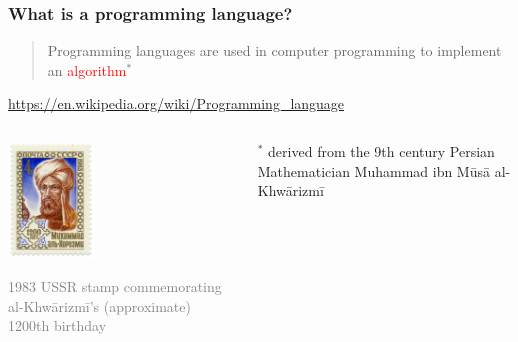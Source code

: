 \documentclass{beamer}
\newcommand{\light}[1]{\textcolor{gray}{#1}}
\newcommand{\red}[1]{\textcolor{red}{#1}}
\begin{document}
\begin{frame}
\frametitle{What is a programming language?}

\begin{quote}
Programming languages are used in computer programming to implement an 
\red{algorithm}$^*$
\end{quote}
\begin{flushright}
\footnotesize
 \light{\url{https://en.wikipedia.org/wiki/Programming_language}}
\end{flushright}
\pause 

\begin{columns}
\begin{column}{0.4\textwidth}
\begin{center}
\includegraphics[width=23mm]{img/1983_CPA_5426.png}
\end{center}
\footnotesize
\light{1983 USSR stamp commemorating al-Khwārizmī's (approximate) 1200th 
birthday}
\end{column}

\begin{column}{0.55\textwidth}

$^*$ derived from the 9th century Persian Mathematician Muhammad ibn Mūsā 
al-Khwārizmī
\vspace{10mm}
\end{column}
\end{columns}
\end{frame}
\end{document}
